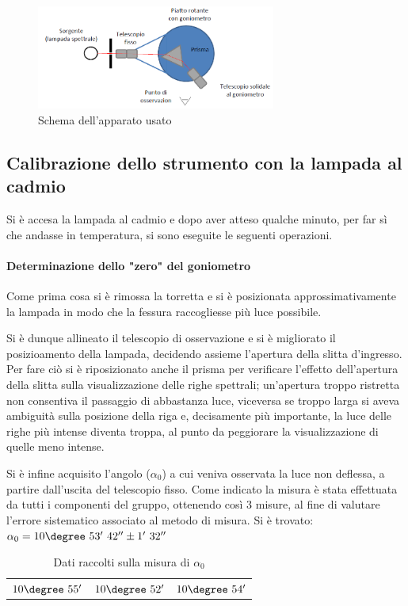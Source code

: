 \documentclass[a4paper,10pt]{article}
\begin{document}
\begin{figure}[H]
	\centering
	\includegraphics[width=0.7\textwidth]{../grafici/Schema1.png}
	\caption{Schema dell'apparato usato}
	\label{fig:schema1}
\end{figure}

\subsection{Calibrazione dello strumento con la lampada al cadmio}

Si è accesa la lampada al cadmio e dopo aver atteso qualche minuto, per far sì che andasse in temperatura, si sono eseguite le seguenti operazioni.

\paragraph{Determinazione dello "zero" del goniometro} Come prima cosa si è rimossa la torretta e si è posizionata approssimativamente la lampada in modo che la fessura raccogliesse più luce possibile. 

Si è dunque allineato il telescopio di osservazione e si è migliorato il posizioamento della lampada, decidendo assieme l'apertura della slitta d'ingresso. Per fare ciò si è riposizionato anche il prisma per verificare l'effetto dell'apertura della slitta sulla visualizzazione delle righe spettrali; un'apertura troppo ristretta non consentiva il passaggio di abbastanza luce, viceversa se troppo larga si aveva ambiguità sulla posizione della riga e, decisamente più importante, la luce delle righe più intense diventa troppa, al punto da peggiorare la visualizzazione di quelle meno intense.

Si è infine acquisito l'angolo ($\alpha_0$) a cui veniva osservata la luce non deflessa, a partire dall'uscita del telescopio fisso. Come indicato la misura è stata effettuata da tutti i componenti del gruppo, ottenendo così 3 misure, al fine di valutare l'errore sistematico associato al metodo di misura.
Si è trovato: $\alpha_0 = 10\degree~53'~42''\pm 1'~32''$
\begin{table}[H]
	\centering
	\begin{tabular}{c|c|c}
		$10\degree~55'$  & $10\degree~52'$ & $10\degree~54'$\\
	\end{tabular}
\caption{Dati raccolti sulla misura di $\alpha_0$}
\end{table}
\end{document}
